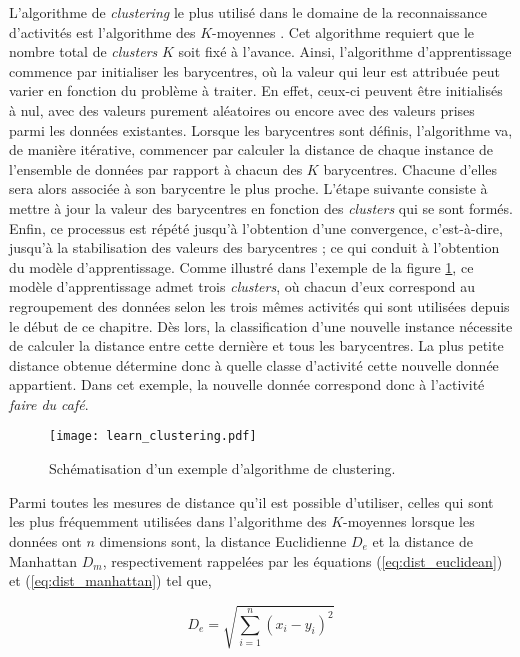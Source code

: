 L'algorithme de \textit{clustering} le plus utilisé dans le domaine de la reconnaissance d'activités est l'algorithme des $K$-moyennes \citep{Messing2009, Kovashka2010}. Cet algorithme requiert que le nombre total de \textit{clusters} $K$ soit fixé à l'avance. Ainsi, l'algorithme d'apprentissage commence par initialiser les barycentres, où la valeur qui leur est attribuée peut varier en fonction du problème à traiter. En effet, ceux-ci peuvent être initialisés à nul, avec des valeurs purement aléatoires ou encore avec des valeurs prises parmi les données existantes. Lorsque les barycentres sont définis, l'algorithme va, de manière itérative, commencer par calculer la distance de chaque instance de l'ensemble de données par rapport à chacun des $K$ barycentres. Chacune d'elles sera alors associée à son barycentre le plus proche. L'étape suivante consiste à mettre à jour la valeur des barycentres en fonction des \textit{clusters} qui se sont formés. Enfin, ce processus est répété jusqu'à l'obtention d'une convergence, c'est-à-dire, jusqu'à la stabilisation des valeurs des barycentres ; ce qui conduit à l'obtention du modèle d'apprentissage. Comme illustré dans l'exemple de la figure \ref{fig:learn_clustering}, ce modèle d'apprentissage admet trois \textit{clusters}, où chacun d'eux correspond au regroupement des données selon les trois mêmes activités qui sont utilisées depuis le début de ce chapitre. Dès lors, la classification d'une nouvelle instance nécessite de calculer la distance entre cette dernière et tous les barycentres. La plus petite distance obtenue détermine donc à quelle classe d'activité cette nouvelle donnée appartient. Dans cet exemple, la nouvelle donnée correspond donc à l'activité \og \textit{faire du café}\fg.

\begin{figure}[H]
	\centering
	\texttt{[image: learn\_clustering.pdf]}
	\caption{Schématisation d'un exemple d'algorithme de clustering.}
	\label{fig:learn_clustering}
\end{figure}

\noindent Parmi toutes les mesures de distance qu'il est possible d'utiliser, celles qui sont les plus fréquemment utilisées dans l'algorithme des $K$-moyennes lorsque les données ont $n$ dimensions sont, la distance Euclidienne $D_e$ et la distance de Manhattan $D_m$, respectivement rappelées par les équations (\ref{eq:dist_euclidean}) et (\ref{eq:dist_manhattan}) tel que,

\begin{equation}
	\label{eq:dist_euclidean}
	D_e = \sqrt{\sum_{i=1}^{n}(x_i-y_i)^2}
\end{equation}

